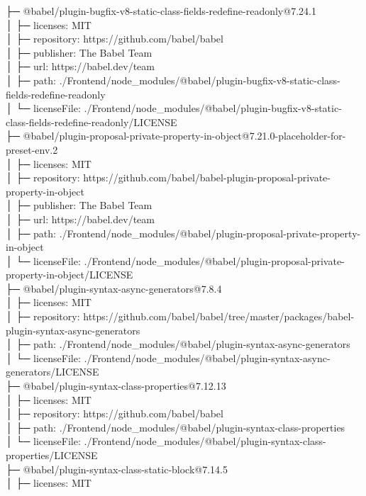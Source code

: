 ├─ @babel/plugin-bugfix-v8-static-class-fields-redefine-readonly@7.24.1\\
│  ├─ licenses: MIT\\
│  ├─ repository: https://github.com/babel/babel\\
│  ├─ publisher: The Babel Team\\
│  ├─ url: https://babel.dev/team\\
│  ├─ path: ./Frontend/node\_modules/@babel/plugin-bugfix-v8-static-class-fields-redefine-readonly\\
│  └─ licenseFile: ./Frontend/node\_modules/@babel/plugin-bugfix-v8-static-class-fields-redefine-readonly/LICENSE\\
├─ @babel/plugin-proposal-private-property-in-object@7.21.0-placeholder-for-preset-env.2\\
│  ├─ licenses: MIT\\
│  ├─ repository: https://github.com/babel/babel-plugin-proposal-private-property-in-object\\
│  ├─ publisher: The Babel Team\\
│  ├─ url: https://babel.dev/team\\
│  ├─ path: ./Frontend/node\_modules/@babel/plugin-proposal-private-property-in-object\\
│  └─ licenseFile: ./Frontend/node\_modules/@babel/plugin-proposal-private-property-in-object/LICENSE\\
├─ @babel/plugin-syntax-async-generators@7.8.4\\
│  ├─ licenses: MIT\\
│  ├─ repository: https://github.com/babel/babel/tree/master/packages/babel-plugin-syntax-async-generators\\
│  ├─ path: ./Frontend/node\_modules/@babel/plugin-syntax-async-generators\\
│  └─ licenseFile: ./Frontend/node\_modules/@babel/plugin-syntax-async-generators/LICENSE\\
├─ @babel/plugin-syntax-class-properties@7.12.13\\
│  ├─ licenses: MIT\\
│  ├─ repository: https://github.com/babel/babel\\
│  ├─ path: ./Frontend/node\_modules/@babel/plugin-syntax-class-properties\\
│  └─ licenseFile: ./Frontend/node\_modules/@babel/plugin-syntax-class-properties/LICENSE\\
├─ @babel/plugin-syntax-class-static-block@7.14.5\\
│  ├─ licenses: MIT\\
